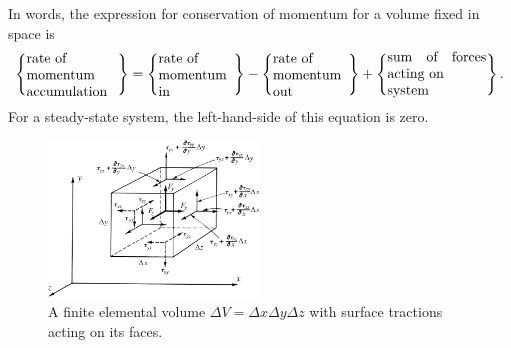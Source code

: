 \documentclass[twoside,11pt]		{report}
\begin{document}
In words, the expression for conservation of momentum for a volume
fixed in space is
\begin{equation}
\left\{ \parbox{23mm}{rate of\\ momentum\\ accumulation} \right\}=
\left\{ \parbox{19mm}{rate of\\ momentum\\ in} \right\}-
\left\{ \parbox{19mm}{rate of\\ momentum\\ out} \right\}+
\left\{ \parbox{25mm}{sum of forces acting on\\ system} \right\}.
\label{eq.mom_bal_words}
\end{equation}
For a steady-state system, the left-hand-side of this equation is
zero.

\begin{figure}
\begin{center}
\includegraphics[width=0.5\textwidth]{Fung-3.8.eps}
\end{center}
\caption{A finite elemental volume $\Delta V=\Delta x\Delta y\Delta z$
with surface tractions acting on its faces.}
\label{fig.momV}
\end{figure}
\end{document}
